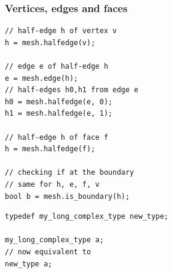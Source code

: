 \begin{frame}[fragile]
\frametitle{Vertices, edges and faces}
\lstset{ numbers=none }
\begin{lstlisting}
// half-edge h of vertex v
h = mesh.halfedge(v);

// edge e of half-edge h
e = mesh.edge(h);
// half-edges h0,h1 from edge e
h0 = mesh.halfedge(e, 0);
h1 = mesh.halfedge(e, 1);

// half-edge h of face f
h = mesh.halfedge(f);

// checking if at the boundary
// same for h, e, f, v
bool b = mesh.is_boundary(h);
\end{lstlisting}
\end{frame}

\begin{frame}
\end{frame}

\begin{frame}[fragile]
\lstset{ numbers=none }
\begin{lstlisting}
typedef my_long_complex_type new_type;

my_long_complex_type a;
// now equivalent to
new_type a;
\end{lstlisting}
\end{frame}